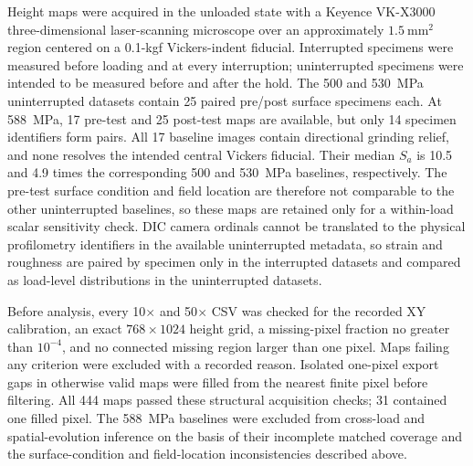 \documentclass[final,12pt]{cas-sc}
\begin{document}
Height maps were acquired in the unloaded state with a Keyence VK-X3000 three-dimensional laser-scanning microscope over an approximately $1.5~\mathrm{mm}^2$ region centered on a 0.1-kgf Vickers-indent fiducial. Interrupted specimens were measured before loading and at every interruption; uninterrupted specimens were intended to be measured before and after the hold. The 500 and 530~MPa uninterrupted datasets contain 25 paired pre/post surface specimens each. At 588~MPa, 17 pre-test and 25 post-test maps are available, but only 14 specimen identifiers form pairs. All 17 baseline images contain directional grinding relief, and none resolves the intended central Vickers fiducial. Their median $S_a$ is 10.5 and 4.9 times the corresponding 500 and 530~MPa baselines, respectively. The pre-test surface condition and field location are therefore not comparable to the other uninterrupted baselines, so these maps are retained only for a within-load scalar sensitivity check. DIC camera ordinals cannot be translated to the physical profilometry identifiers in the available uninterrupted metadata, so strain and roughness are paired by specimen only in the interrupted datasets and compared as load-level distributions in the uninterrupted datasets.

Before analysis, every 10$\times$ and 50$\times$ CSV was checked for the recorded XY calibration, an exact $768\times1024$ height grid, a missing-pixel fraction no greater than $10^{-4}$, and no connected missing region larger than one pixel. Maps failing any criterion were excluded with a recorded reason. Isolated one-pixel export gaps in otherwise valid maps were filled from the nearest finite pixel before filtering. All 444 maps passed these structural acquisition checks; 31 contained one filled pixel. The 588~MPa baselines were excluded from cross-load and spatial-evolution inference on the basis of their incomplete matched coverage and the surface-condition and field-location inconsistencies described above.
\end{document}
